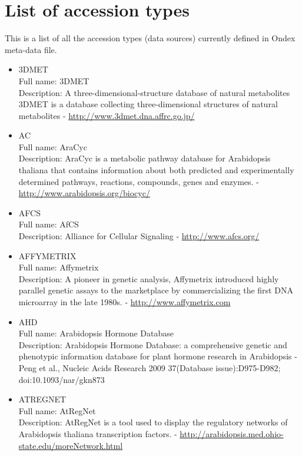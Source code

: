 \chapter{List of accession types}
\label{cha:accessions}
This is a list of all the accession types (data sources) currently defined in Ondex meta-data file.
\begin{itemize}

\item{3DMET}\\ Full name: 3DMET\\ Description: A three-dimensional-structure database of natural metabolites 3DMET is a database collecting three-dimensional structures of natural metabolites - 
\url{http://www.3dmet.dna.affrc.go.jp/}

\item{AC}\\ Full name: AraCyc\\ Description: AraCyc is a metabolic pathway database for Arabidopsis thaliana that contains information about both predicted and experimentally determined pathways, reactions, compounds, genes and enzymes. - 
\url{http://www.arabidopsis.org/biocyc/}

\item{AFCS}\\ Full name: AfCS\\ Description: Alliance for Cellular Signaling - 
\url{http://www.afcs.org/}

\item{AFFYMETRIX}\\ Full name: Affymetrix\\ Description: A pioneer in genetic analysis, Affymetrix introduced highly parallel genetic assays to the marketplace by commercializing the first DNA microarray in the late 1980s. - 
\url{http://www.affymetrix.com}

\item{AHD}\\ Full name: Arabidopsis Hormone Database\\ Description: Arabidopsis Hormone Database: a comprehensive genetic and phenotypic information database for plant hormone research in Arabidopsis - Peng et al., Nucleic Acids Research 2009 37(Database issue):D975-D982; doi:10.1093/nar/gkn873 

\item{ATREGNET}\\ Full name: AtRegNet\\ Description: AtRegNet is a tool used to display the regulatory networks of Arabidopsis thaliana transcription factors. - 
\url{http://arabidopsis.med.ohio-state.edu/moreNetwork.html}


\end{itemize}
